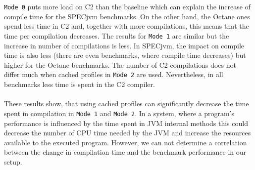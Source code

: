\\\\
\texttt{Mode 0} puts more load on C2 than the baseline which can explain the increase of compile time for the SPECjvm benchmarks. On the other hand, the Octane ones spend less time in C2 and, together with more compilations, this means that the time per compilation decreases. The results for \texttt{Mode 1} are similar but the increase in number of compilations is less. In SPECjvm, the impact on compile time is also less (there are even benchmarks, where compile time decreases) but higher for the Octane benchmarks. The number of C2 compilations does not differ much when cached profiles in \texttt{Mode 2} are used. Nevertheless, in all benchmarks less time is spent in the C2 compiler.
\\\\
These results show, that using cached profiles can significantly decrease the time spent in compilation in \texttt{Mode 1} and \texttt{Mode 2}. In a system, where a program's performance is influenced by the time spent in JVM internal methods this could decrease the number of CPU time needed by the JVM and increase the resources available to the executed program. However, we can not determine a correlation between the change in compilation time and the benchmark performance in our setup.
\clearpage
